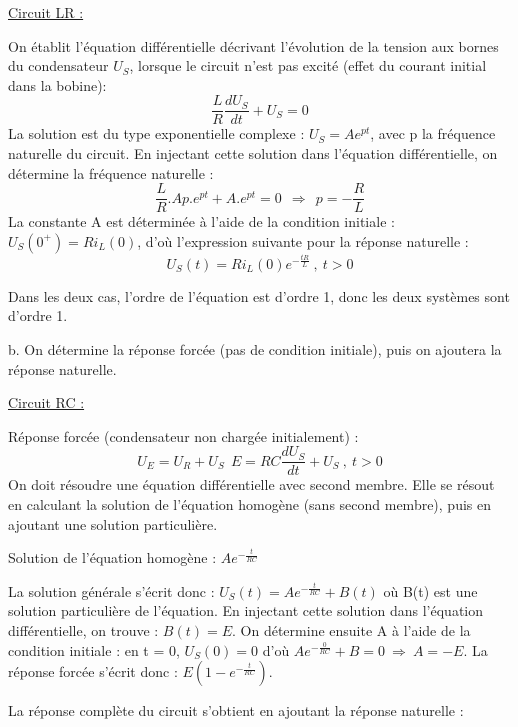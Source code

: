 \documentclass[11pt]{report}
\begin{document}
 	\underline{Circuit LR :}
 	
 	On établit l'équation différentielle décrivant l'évolution de la tension aux bornes du condensateur $U_S$, lorsque le circuit n'est pas excité (effet du courant initial dans la bobine):
 	\begin{equation*}
 	\frac{L}{R}\frac{dU_S}{dt}+U_S=0
 	\end{equation*}
 	La solution est du type exponentielle complexe : $U_S=Ae^{pt}$, avec p la fréquence naturelle du circuit. En injectant cette solution dans l'équation différentielle, on détermine la fréquence naturelle :
 	\begin{equation*}
 	\frac{L}{R}.Ap.e^{pt}+A.e^{pt}=0~~\Rightarrow~~p = -\frac{R}{L}
 	\end{equation*}
 	La constante A est déterminée à l'aide de la condition initiale : $U_S(0^+)=Ri_L(0)$, d'où l'expression suivante pour la réponse naturelle :
 	\begin{equation*}
 	U_S(t)=Ri_L(0)e^{-\frac{tR}{L}}~,~t>0
 	\end{equation*}
 	
 	Dans les deux cas, l'ordre de l'équation est d'ordre 1, donc les deux systèmes sont d'ordre 1.
 	
 	b. On détermine la réponse forcée (pas de condition initiale), puis on ajoutera la réponse naturelle.
 	
 	\underline{Circuit RC :}
 	
 	
 	Réponse forcée (condensateur non chargée initialement) : 
 	\begin{equation*}
 	U_E=U_R+U_S~~E=RC\frac{dU_S}{dt}+U_S~,~t>0
 	\end{equation*}
 	On doit résoudre une équation différentielle avec second membre. Elle se résout en calculant la solution de l'équation homogène (sans second membre), puis en ajoutant une solution particulière.
 	
 	Solution de l'équation homogène : $Ae^{-\frac{t}{RC}}$
 	
 	La solution générale s'écrit donc : $U_S(t)=Ae^{-\frac{t}{RC}}+B(t)$ où B(t) est une solution particulière de l'équation. En injectant cette solution dans l'équation différentielle, on trouve : $ B(t)=E$. On détermine ensuite A à l'aide de la condition initiale : en t = 0, $U_S(0)=0$ d'où $Ae^{-\frac{0}{RC}}+B=0~\Rightarrow~A=-E$. 
 	La réponse forcée s'écrit donc : $E(1-e^{-\frac{t}{RC}})$.
 	
 	La réponse complète du circuit s'obtient en ajoutant la réponse naturelle :
 	
\end{document}
